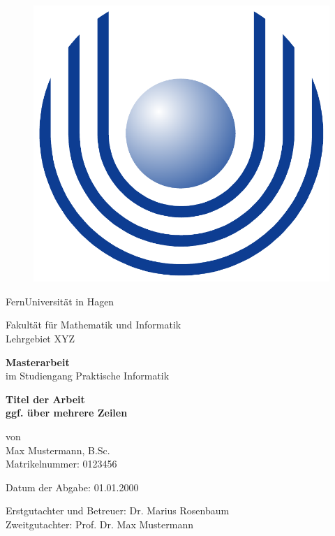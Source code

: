 
\begin{center}
	
	\begin{figure}[htbp]
		\centering
		\includegraphics[scale=0.15]{./Abbildungen/fernuni-logo.pdf}
	\end{figure}
	
	\Large FernUniversität in Hagen
	
	\small Fakultät für Mathematik und Informatik \\ Lehrgebiet XYZ
	
	\vspace{2.5cm}
	
	\large \textbf{Masterarbeit} \\
	
	\large im Studiengang Praktische Informatik \\
	
	\vspace{1.5cm}
	
	\Large \textbf{Titel der Arbeit\\ ggf. über mehrere Zeilen}

	\vspace{1.5cm}
	
	\large von \\ Max Mustermann, B.Sc. \\ Matrikelnummer: 0123456
	
	\vspace{2.0cm}
	
	\normalsize Datum der Abgabe: 01.01.2000
	
	\vspace{3.0cm}
	
	\large Erstgutachter und Betreuer: Dr. Marius Rosenbaum \\ Zweitgutachter: Prof. Dr. Max Mustermann
	
\end{center}

\restoregeometry